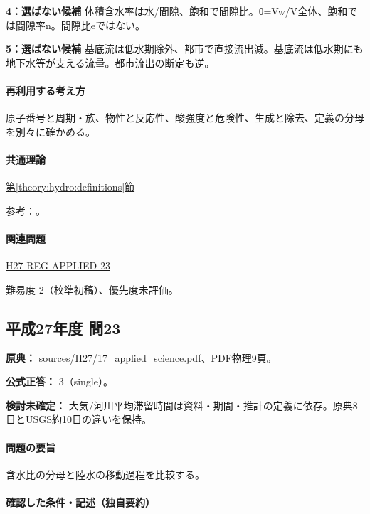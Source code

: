 \noindent\textbf{4：選ばない候補} 体積含水率は水/間隙、飽和で間隙比。θ=Vw/V全体、飽和では間隙率n。間隙比eではない。\par

\noindent\textbf{5：選ばない候補} 基底流は低水期除外、都市で直接流出減。基底流は低水期にも地下水等が支える流量。都市流出の断定も逆。\par

\paragraph{再利用する考え方} 原子番号と周期・族、物性と反応性、酸強度と危険性、生成と除去、定義の分母を別々に確かめる。

\paragraph{共通理論} \hyperref[theory:hydro:definitions]{第\ref*{theory:hydro:definitions}節}

\par 参考：\cite{inorganic_waterchem,inorganic_hydro_ref}。

\paragraph{関連問題} \hyperref[q:h27-reg-applied-23]{H27-REG-APPLIED-23}

\par 難易度 2（校準初稿）、優先度未評価。

\subsection{平成27年度 問23}
\label{q:h27-reg-applied-23}

\noindent\textbf{原典：} sources/H27/17\_applied\_science.pdf、PDF物理9頁。

\textbf{公式正答：} 3（single）。

\par\textbf{検討未確定：} 大気/河川平均滞留時間は資料・期間・推計の定義に依存。原典8日とUSGS約10日の違いを保持。

\paragraph{問題の要旨} 含水比の分母と陸水の移動過程を比較する。

\paragraph{確認した条件・記述（独自要約）}\mbox{}\par

